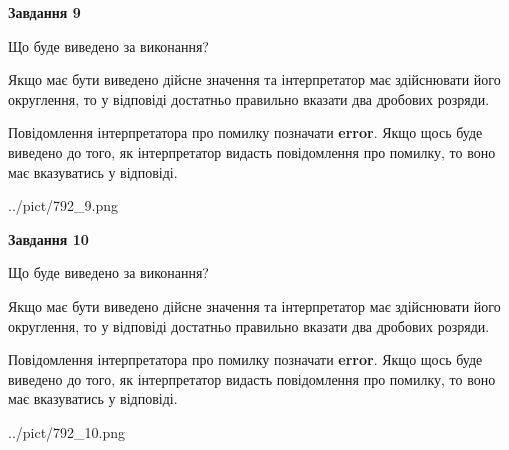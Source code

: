 \documentclass[12pt, ukrainian]{article}
\begin{document}
{\begin {Large}
{\begin {center}\textbf{Завдання 9}\end {center}}\par
Що буде виведено за виконання? \par

Якщо має бути виведено дійсне значення та інтерпретатор має здійснювати його округлення, 
то у відповіді достатньо правильно вказати два дробових розряди.

Повідомлення інтерпретатора про помилку позначати \textbf{error}.
Якщо щось буде виведено до того, як інтерпретатор видасть повідомлення про помилку, 
то воно має вказуватись у відповіді. \par

\begin{center}
	{../pict/792_9.png}
\end{center}
\newpage

{\begin {center}\textbf{Завдання 10}\end {center}}\par
Що буде виведено за виконання? \par

Якщо має бути виведено дійсне значення та інтерпретатор має здійснювати його округлення, 
то у відповіді достатньо правильно вказати два дробових розряди.

Повідомлення інтерпретатора про помилку позначати \textbf{error}.
Якщо щось буде виведено до того, як інтерпретатор видасть повідомлення про помилку, 
то воно має вказуватись у відповіді. \par

\begin{center}
	{../pict/792_10.png}
\end{center}
\newpage

\end {Large}}
\end{document}

